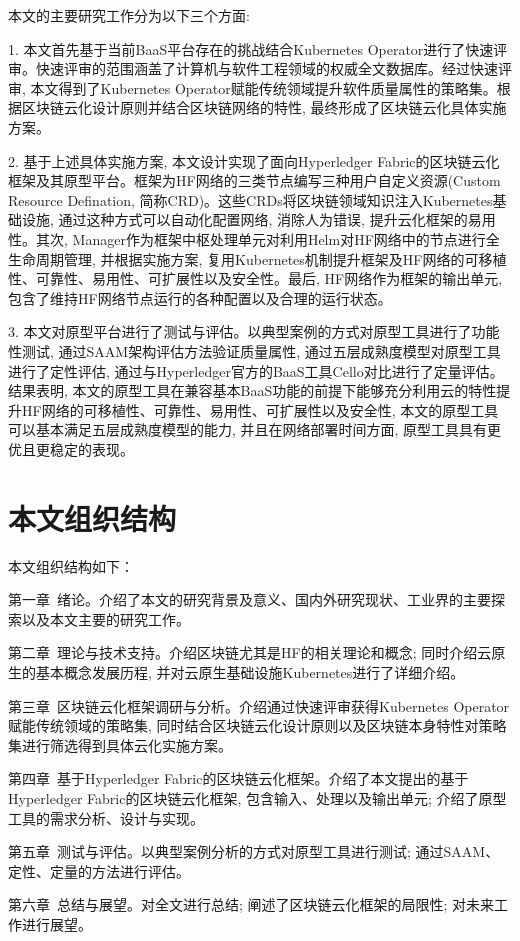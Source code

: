 本文的主要研究工作分为以下三个方面: 

1. 本文首先基于当前BaaS平台存在的挑战结合Kubernetes Operator进行了快速评审。快速评审的范围涵盖了计算机与软件工程领域的权威全文数据库。经过快速评审, 本文得到了Kubernetes Operator赋能传统领域提升软件质量属性的策略集。根据区块链云化设计原则并结合区块链网络的特性, 最终形成了区块链云化具体实施方案。

2. 基于上述具体实施方案, 本文设计实现了面向Hyperledger Fabric的区块链云化框架及其原型平台。框架为HF网络的三类节点编写三种用户自定义资源(Custom Resource Defination, 简称CRD)。这些CRDs将区块链领域知识注入Kubernetes基础设施, 通过这种方式可以自动化配置网络, 消除人为错误, 提升云化框架的易用性。其次, Manager作为框架中枢处理单元对利用Helm对HF网络中的节点进行全生命周期管理, 并根据实施方案, 复用Kubernetes机制提升框架及HF网络的可移植性、可靠性、易用性、可扩展性以及安全性。最后, HF网络作为框架的输出单元, 包含了维持HF网络节点运行的各种配置以及合理的运行状态。

3. 本文对原型平台进行了测试与评估。以典型案例的方式对原型工具进行了功能性测试, 通过SAAM架构评估方法验证质量属性, 通过五层成熟度模型对原型工具进行了定性评估, 通过与Hyperledger官方的BaaS工具Cello对比进行了定量评估。结果表明, 本文的原型工具在兼容基本BaaS功能的前提下能够充分利用云的特性提升HF网络的可移植性、可靠性、易用性、可扩展性以及安全性, 本文的原型工具可以基本满足五层成熟度模型的能力, 并且在网络部署时间方面, 原型工具具有更优且更稳定的表现。


\section{本文组织结构}

本文组织结构如下：

第一章~绪论。介绍了本文的研究背景及意义、国内外研究现状、工业界的主要探索以及本文主要的研究工作。

第二章~理论与技术支持。介绍区块链尤其是HF的相关理论和概念; 同时介绍云原生的基本概念发展历程, 并对云原生基础设施Kubernetes进行了详细介绍。

第三章~区块链云化框架调研与分析。介绍通过快速评审获得Kubernetes Operator赋能传统领域的策略集, 同时结合区块链云化设计原则以及区块链本身特性对策略集进行筛选得到具体云化实施方案。

第四章~基于Hyperledger Fabric的区块链云化框架。介绍了本文提出的基于Hyperledger Fabric的区块链云化框架, 包含输入、处理以及输出单元; 介绍了原型工具的需求分析、设计与实现。

第五章~测试与评估。以典型案例分析的方式对原型工具进行测试; 通过SAAM、定性、定量的方法进行评估。

第六章~总结与展望。对全文进行总结; 阐述了区块链云化框架的局限性; 对未来工作进行展望。


